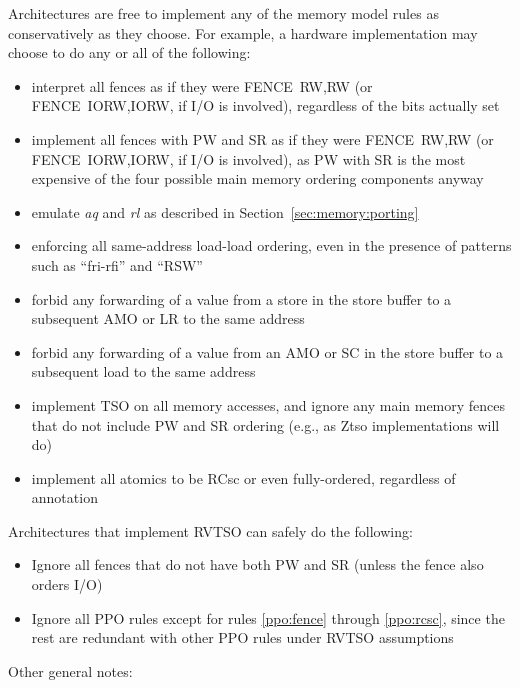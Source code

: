 Architectures are free to implement any of the memory model rules as conservatively as they choose.  For example, a hardware implementation may choose to do any or all of the following:
  \begin{itemize}
    \item interpret all fences as if they were FENCE~RW,RW (or FENCE~IORW,IORW, if I/O is involved), regardless of the bits actually set
    \item implement all fences with PW and SR as if they were FENCE~RW,RW (or FENCE~IORW,IORW, if I/O is involved), as PW with SR is the most expensive of the four possible main memory ordering components anyway
    \item emulate {\em aq} and {\em rl} as described in Section~\ref{sec:memory:porting}
    \item enforcing all same-address load-load ordering, even in the presence of patterns such as ``fri-rfi'' and ``RSW''
    \item forbid any forwarding of a value from a store in the store buffer to a subsequent AMO or LR to the same address
    \item forbid any forwarding of a value from an AMO or SC in the store buffer to a subsequent load to the same address
    \item implement TSO on all memory accesses, and ignore any main memory fences that do not include PW and SR ordering (e.g., as Ztso implementations will do)
    \item implement all atomics to be RCsc or even fully-ordered, regardless of annotation
  \end{itemize}

Architectures that implement RVTSO can safely do the following:
\begin{itemize}
  \item Ignore all fences that do not have both PW and SR (unless the fence also orders I/O)
  \item Ignore all PPO rules except for rules \ref{ppo:fence} through \ref{ppo:rcsc}, since the rest are redundant with other PPO rules under RVTSO assumptions
\end{itemize}

Other general notes:

